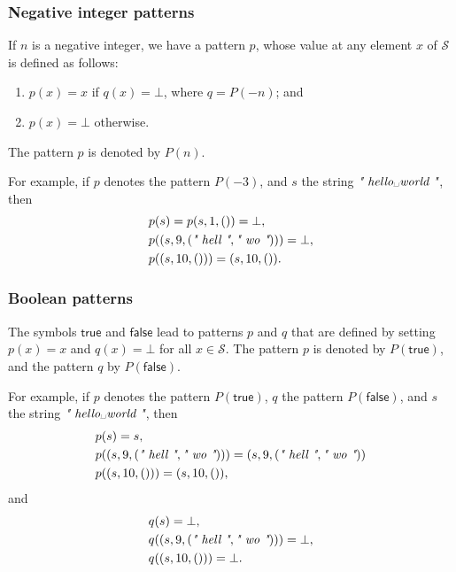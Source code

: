 \documentclass{article}
\begin{document}
\subsubsection{Negative integer patterns}
\label{sec:upt2mdy9}

If \(n\) is a negative integer, we have a pattern \(p\), whose value
at any element \(x\) of \(\mathcal{S}\) is defined as follows:
\begin{enumerate}
\item \(p(x) = x\) if \(q(x) = \bot\), where \(q = P(-n)\); and
\item \(p(x) = \bot\) otherwise.
\end{enumerate}
The pattern \(p\) is denoted by \(P(n)\).

For example, if \(p\) denotes the pattern \(P(-3)\), and \(s\) the
string \(\text{\itshape" \text{hello␣world} "}\), then
\begin{align*}
  &p(s) = p(s, 1, ()) = \bot, \\
  &p((s, 9, (\text{\itshape" hell "}, \text{\itshape" wo "}))) = \bot, \\
  &p((s, 10, ())) = (s, 10, ()).
\end{align*}

\subsubsection{Boolean patterns}
\label{sec:kuf3y73z}

The symbols \(\mathsf{true}\) and \(\mathsf{false}\) lead to patterns
\(p\) and \(q\) that are defined by setting \(p(x) = x\) and
\(q(x) = \bot\) for all \(x \in \mathcal{S}\).  The pattern \(p\) is
denoted by \(P(\mathsf{true})\), and the pattern \(q\) by
\(P(\mathsf{false})\).

For example, if \(p\) denotes the pattern \(P(\mathsf{true})\), \(q\)
the pattern \(P(\mathsf{false})\), and \(s\) the string
\(\text{\itshape" \text{hello␣world} "}\), then
\begin{align*}
  &p(s) = s, \\
  &p((s, 9, (\text{\itshape" hell "}, \text{\itshape" wo "}))) =
    (s, 9, (\text{\itshape" hell "}, \text{\itshape" wo "})) \\
  &p((s, 10, ())) = (s, 10, ()),
\end{align*}
and
\begin{align*}
  &q(s) = \bot, \\
  &q((s, 9, (\text{\itshape" hell "}, \text{\itshape" wo "}))) = \bot, \\
  &q((s, 10, ())) = \bot.
\end{align*}
\end{document}
